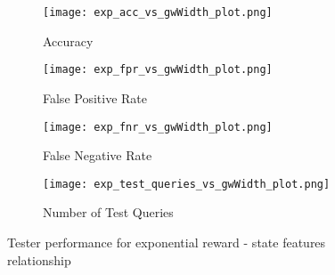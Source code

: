 \begin{figure}[h]
     \centering
     \begin{subfigure}[h]{0.4\textwidth}
         \centering
         \texttt{[image: exp\_acc\_vs\_gwWidth\_plot.png]}
         \caption{Accuracy}
         \label{fig:exp_acc_vs_features_plot}
     \end{subfigure}
    \hspace{5mm}
     \begin{subfigure}[h]{0.4\textwidth}
         \centering
         \texttt{[image: exp\_fpr\_vs\_gwWidth\_plot.png]}
         \caption{False Positive Rate}
         \label{fig:exp_fpr_vs_features_plot}
     \end{subfigure}
     \hspace{5mm}
     \begin{subfigure}[h]{0.4\textwidth}
         \centering
         \texttt{[image: exp\_fnr\_vs\_gwWidth\_plot.png]}
         \caption{False Negative Rate}
         \label{fig:exp_fnr_vs_features_plot}
     \end{subfigure}
     \hspace{5mm}
    \begin{subfigure}[h]{0.4\textwidth}
         \centering
         \texttt{[image: exp\_test\_queries\_vs\_gwWidth\_plot.png]}
         \caption{Number of Test Queries}
         \label{fig:exp_test_queries_vs_features_plot}
     \end{subfigure}
    \caption{Tester performance for exponential reward - state features relationship}
    \label{fig:exp_experiments}
\end{figure}

